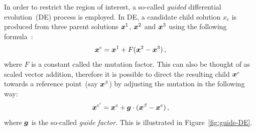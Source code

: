 In order to restrict the region of interest, a so-called \emph{guided} differential evolution~(DE) process is employed. In DE, a candidate child solution $x_c$ is produced from three parent solutions $\boldsymbol{x}^1$, $\boldsymbol{x}^2$ and $\boldsymbol{x}^3$ using the following formula~\cite{storn1997differential}:
\begin{equation}
\boldsymbol{x}^c = \boldsymbol{x}^1 + F(\boldsymbol{x}^2 - \boldsymbol{x}^3)\,,
\end{equation}
where $F$ is a constant called the mutation factor. This can also be thought of as scaled vector addition, therefore it is possible to direct the resulting child $\boldsymbol{x}^c$ towards a reference point~(say $\boldsymbol{x}^\beta$) by adjusting the mutation in the following way:
\begin{equation}\label{eq:nudge}
\boldsymbol{x}^{c'} = \boldsymbol{x}^c + \boldsymbol{g}\cdot(\boldsymbol{x}^\beta - \boldsymbol{x}^c)\,,
\end{equation}
where $\boldsymbol{g}$ is the so-called \emph{guide factor}. This is illustrated in Figure~\ref{fig:guide-DE}. 

